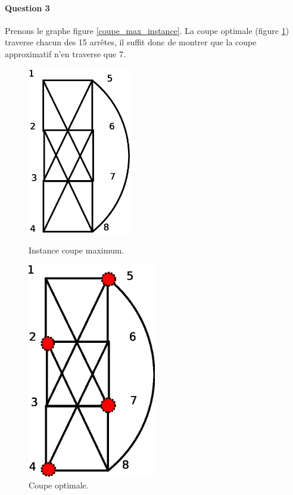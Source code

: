\paragraph{Question 3}

Prenons le graphe figure \ref{coupe_max_instance}. La coupe optimale (figure \ref{coupe_max_opt}) traverse chacun des 15 arrêtes, il suffit donc de montrer que la coupe approximatif n'en traverse que 7. 

\begin{figure}[ht]
\begin{minipage}[b]{0.5\linewidth}
\centering
\centering
\includegraphics[width=0.4\textwidth]{../images/exo4.eps}
\caption{Instance coupe maximum.}
\label{coupe_max_instance}
\end{minipage}
\hspace{0.5cm}
\begin{minipage}[b]{0.4\linewidth}
\centering
\includegraphics[width=0.5\textwidth]{../images/exo4_opt.eps}
\caption{Coupe optimale.}
\label{coupe_max_opt}
\end{minipage}
\end{figure}

